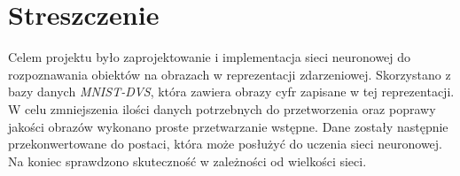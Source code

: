 \documentclass[11pt,a4paper,titlepage]{article}
\begin{document}


\section*{Streszczenie}
Celem projektu było zaprojektowanie i implementacja sieci neuronowej do rozpoznawania obiektów na obrazach w reprezentacji zdarzeniowej. Skorzystano z bazy danych \textit{MNIST-DVS}, która zawiera obrazy cyfr zapisane w tej reprezentacji. W celu zmniejszenia ilości danych potrzebnych do przetworzenia oraz poprawy jakości obrazów wykonano proste przetwarzanie wstępne. Dane zostały następnie przekonwertowane do postaci, która może posłużyć do uczenia sieci neuronowej. Na koniec sprawdzono skuteczność w zależności od wielkości sieci.
 
\clearpage
\tableofcontents
\clearpage



\appendix
\nocite{*}
\printbibliography
{}
\end{document}
